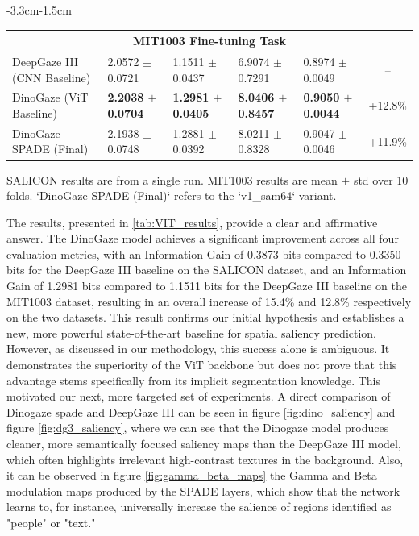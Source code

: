 \begin{table}[h!]
\begin{adjustwidth}{-3.3cm}{-1.5cm}
{\begin{tabular}{@{}l l l l l c@{}}
    \multicolumn{6}{c}{\textbf{MIT1003 Fine-tuning Task}} \\
    \midrule
    DeepGaze III (CNN Baseline) & 2.0572 $\pm$ 0.0721 & 1.1511 $\pm$ 0.0437 & 6.9074 $\pm$ 0.7291 & 0.8974 $\pm$ 0.0049 & -- \\
    DinoGaze (ViT Baseline)     & \bfseries 2.2038 $\pm$ 0.0704 & \bfseries 1.2981 $\pm$ 0.0405 & \bfseries 8.0406 $\pm$ 0.8457 & \bfseries 0.9050 $\pm$ 0.0044 & +12.8\% \\
    DinoGaze-SPADE (Final)      & 2.1938 $\pm$ 0.0748 & 1.2881 $\pm$ 0.0392 & 8.0211 $\pm$ 0.8328 & 0.9047 $\pm$ 0.0046 & +11.9\% \\
    \bottomrule
\end{tabular}
\par\medskip
\footnotesize{
    SALICON results are from a single run. MIT1003 results are mean $\pm$ std over 10 folds.
    `DinoGaze-SPADE (Final)` refers to the `v1\_sam64` variant.
}
} %
\end{adjustwidth}
\end{table}

The results, presented in \cref{tab:VIT_results}, provide a clear and affirmative answer.
The DinoGaze model achieves a significant improvement across all four evaluation metrics, with an Information Gain of 0.3873 bits compared to 0.3350 bits for the DeepGaze III baseline on the SALICON dataset, and an Information Gain of 1.2981 bits compared to 1.1511 bits for the DeepGaze III baseline on the MIT1003 dataset, resulting in an overall increase of 15.4\% and 12.8\% respectively on the two datasets.
This result confirms our initial hypothesis and establishes a new, more powerful state-of-the-art baseline for spatial saliency prediction. However, as discussed in our methodology, this success alone is ambiguous. It demonstrates the superiority of the ViT backbone but does not prove that this advantage stems specifically from its implicit segmentation knowledge. This motivated our next, more targeted set of experiments.
A direct comparison of Dinogaze spade and DeepGaze III can be seen in figure \ref{fig:dino_saliency} and figure \ref{fig:dg3_saliency}, where we can see that the Dinogaze model produces cleaner, more semantically focused saliency maps than the DeepGaze III model, which often highlights irrelevant high-contrast textures in the background.
Also, it can be observed in figure \ref{fig:gamma_beta_maps} the Gamma and Beta modulation maps produced by the SPADE layers, which show that the network learns to, for instance, universally increase the salience of regions identified as "people" or "text."

